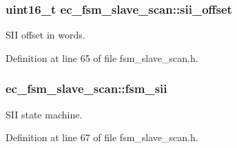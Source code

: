 \subsubsection[{sii\-\_\-offset}]{\setlength{\rightskip}{0pt plus 5cm}uint16\-\_\-t ec\-\_\-fsm\-\_\-slave\-\_\-scan\-::sii\-\_\-offset}\label{structec__fsm__slave__scan_a8cb75bc7d08ed43d9915f1d2a4411d5f}


S\-I\-I offset in words. 



Definition at line 65 of file fsm\-\_\-slave\-\_\-scan.\-h.

\subsubsection[{fsm\-\_\-sii}]{ ec\-\_\-fsm\-\_\-slave\-\_\-scan\-::fsm\-\_\-sii}\label{structec__fsm__slave__scan_a711257451b14076272e1731592a42b61}


S\-I\-I state machine. 



Definition at line 67 of file fsm\-\_\-slave\-\_\-scan.\-h.

